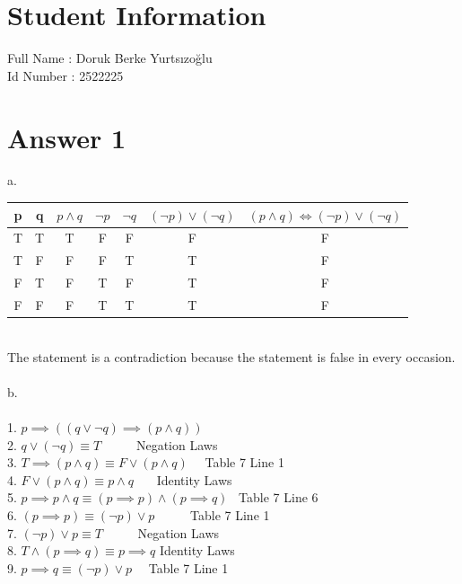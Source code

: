 \documentclass[12pt]{article}
\begin{document}
\section*{Student Information } 
Full Name : Doruk Berke Yurtsızoğlu \\
Id Number : 2522225 \\

\section*{Answer 1}
a.
\begin{table}[ht]


\begin{tabular}{|c|c|c|c|c|c|c|} 
\hline 
p & q & $p \land q$ & $\neg p$ & $\neg q$ & $(\neg p) \lor (\neg q)$ & $(p \land q) \iff (\neg p) \lor (\neg q)$ \\ [0.5ex] %
\hline\hline 
T & T & T & F & F & F & F \\ %
\hline
T & F & F & F & T & T & F \\
\hline
F & T & F & T & F & T & F \\
\hline
F & F & F & T & T & T & F \\
\hline %
\end{tabular}
\label{table:nonlin} %
\end{table}
\\
The statement is a contradiction because the statement is false in every occasion. \\
\\
b.\\
\\
1. $ p \implies ((q \lor \neg q) \implies (p \land q))$ \\
2. $ q \lor (\neg q) \equiv T$ \ \qquad \ \ \qquad \qquad \qquad \qquad \ \ Negation Laws \\
3. $ T \implies (p \land q) \equiv F \lor (p \land q)$ \   \qquad \qquad     \   Table 7 Line 1 \\
4. $ F \lor (p \land q) \equiv p \land q$ \ \qquad \ \ \qquad \qquad \qquad   Identity Laws \\
5. $ p \implies p \land q \equiv (p \implies p) \land (p \implies q)$ \             Table 7 Line 6 \\
6. $ (p \implies p) \equiv (\neg p) \lor p$ \ \qquad \qquad \ \qquad \ \ \       Table 7 Line 1 \\
7. $ (\neg p) \lor p \equiv T$  \ \ \qquad \ \ \qquad \qquad \qquad \qquad \ Negation Laws \\
8. $ T \land (p \implies q) \equiv p \implies q$    \qquad \qquad \qquad        Identity Laws \\
9. $ p \implies q \equiv (\neg p) \lor p$    \ \qquad \ \qquad \qquad \qquad  Table 7 Line 1 \\ 
\end{document}
